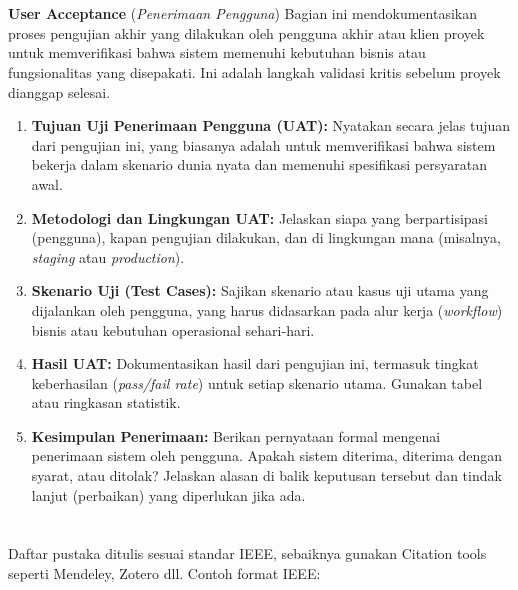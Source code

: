 \documentclass{elsinta}
\begin{document}
\section{\UserAcceptanceTitle}
\textbf{User Acceptance} (\textit{Penerimaan Pengguna})
Bagian ini mendokumentasikan proses pengujian akhir yang dilakukan oleh pengguna akhir atau klien proyek untuk memverifikasi bahwa sistem memenuhi kebutuhan bisnis atau fungsionalitas yang disepakati. Ini adalah langkah validasi kritis sebelum proyek dianggap selesai.
\begin{enumerate}
    \item \textbf{Tujuan Uji Penerimaan Pengguna (UAT):} Nyatakan secara jelas tujuan dari pengujian ini, yang biasanya adalah untuk memverifikasi bahwa sistem bekerja dalam skenario dunia nyata dan memenuhi spesifikasi persyaratan awal.
    \item \textbf{Metodologi dan Lingkungan UAT:} Jelaskan siapa yang berpartisipasi (pengguna), kapan pengujian dilakukan, dan di lingkungan mana (misalnya, \textit{staging} atau \textit{production}).
    \item \textbf{Skenario Uji (Test Cases):} Sajikan skenario atau kasus uji utama yang dijalankan oleh pengguna, yang harus didasarkan pada alur kerja (\textit{workflow}) bisnis atau kebutuhan operasional sehari-hari.
    \item \textbf{Hasil UAT:} Dokumentasikan hasil dari pengujian ini, termasuk tingkat keberhasilan (\textit{pass/fail rate}) untuk setiap skenario utama. Gunakan tabel atau ringkasan statistik.
    \item \textbf{Kesimpulan Penerimaan:} Berikan pernyataan formal mengenai penerimaan sistem oleh pengguna. Apakah sistem diterima, diterima dengan syarat, atau ditolak? Jelaskan alasan di balik keputusan tersebut dan tindak lanjut (perbaikan) yang diperlukan jika ada.
\end{enumerate}


\section{\ReferencesTitle}
Daftar pustaka ditulis sesuai standar IEEE, sebaiknya gunakan Citation tools seperti Mendeley, Zotero dll.  
Contoh format IEEE:  
\renewcommand{\refname}{}      %

\section{\AbbrevTitle}
\end{document}
